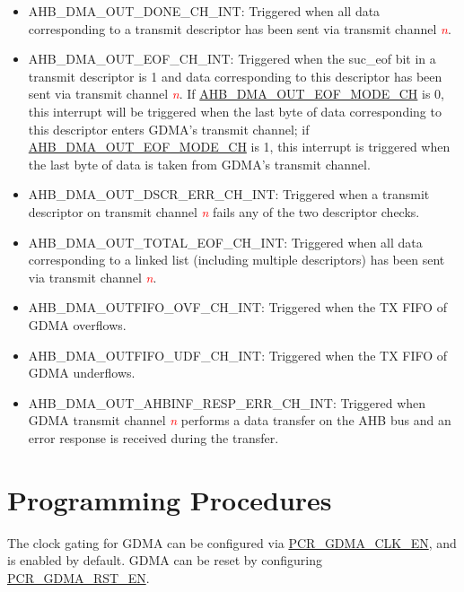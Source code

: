 \documentclass[main\_\_EN.tex]{subfiles}
\begin{document}
\begin{itemize}
    \item \label{int:GDMAOUTDONEINT}AHB\_DMA\_OUT\_DONE\_CH\_INT: Triggered when all data corresponding to a transmit descriptor has been sent via transmit channel \textcolor{red}{\it{n}}.
    \item \label{int:GDMAOUTEOFINT}AHB\_DMA\_OUT\_EOF\_CH\_INT: Triggered when the suc\_eof bit in a transmit descriptor is 1 and data corresponding to this descriptor has been sent via transmit channel \textcolor{red}{\it{n}}. If \hyperref[fielddesc:AHBDMAOUTEOFMODECHN]{AHB\_DMA\_OUT\_EOF\_MODE\_CH} is 0, this interrupt will be triggered when the last byte of data corresponding to this descriptor enters GDMA's transmit channel; if \hyperref[fielddesc:AHBDMAOUTEOFMODECHN]{AHB\_DMA\_OUT\_EOF\_MODE\_CH} is 1, this interrupt is triggered when the last byte of data is taken from GDMA's transmit channel.
    \item \label{int:GDMAOUTDSCRERRINT}AHB\_DMA\_OUT\_DSCR\_ERR\_CH\_INT: Triggered when a transmit descriptor on transmit channel \textcolor{red}{\it{n}} fails any of the two descriptor checks.
    \item \label{int: GDMAOUTTOTALEOFINT}AHB\_DMA\_OUT\_TOTAL\_EOF\_CH\_INT: Triggered when all data corresponding to a linked list (including multiple descriptors) has been sent via transmit channel \textcolor{red}{\it{n}}.
    \item \label{int:GDMAOUTFIFOOVFINT}AHB\_DMA\_OUTFIFO\_OVF\_CH\_INT: Triggered when the TX FIFO of GDMA overflows.
    \item \label{int:GDMAOUTFIFOUDFINT}AHB\_DMA\_OUTFIFO\_UDF\_CH\_INT: Triggered when the TX FIFO of GDMA underflows.
    \item \label{int:GDMAOUTAHBINFRESPERRINT}AHB\_DMA\_OUT\_AHBINF\_RESP\_ERR\_CH\_INT: Triggered when GDMA transmit channel \textcolor{red}{\it{n}} performs a data transfer on the AHB bus and an error response is received during the transfer.
\end{itemize}


\section{Programming Procedures}

The clock gating for GDMA can be configured via \hyperref[fielddesc:PCRGDMACLKEN]{PCR\_GDMA\_CLK\_EN}, and is enabled by default. GDMA can be reset by configuring \hyperref[fielddesc:PCRGDMARSTEN]{PCR\_GDMA\_RST\_EN}.
\end{document}
